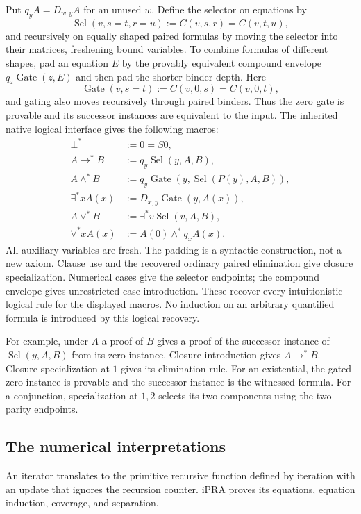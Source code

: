 \documentclass[11pt,letterpaper]{article}
\theoremstyle{definition}
\begin{document}
Put $q_yA=D_{w,y}A$ for an unused $w$.  Define the selector on equations by
\[
 \operatorname{Sel}(v,s=t,r=u)
  := C(v,s,r)=C(v,t,u),
\]
and recursively on equally shaped paired formulas by moving the selector
into their matrices, freshening bound variables.  To combine formulas of
different shapes, pad an equation $E$ by the provably equivalent compound
envelope $q_z\operatorname{Gate}(z,E)$ and then pad the shorter binder
depth.  Here
\[
 \operatorname{Gate}(v,s=t):=C(v,0,s)=C(v,0,t),
\]
and gating also moves recursively through paired binders.  Thus the zero
gate is provable and its successor instances are equivalent to the input.
The inherited native logical interface gives the following macros:
\[
\begin{aligned}
 \bot^* &:=0=S0,\\
 A\to^*B &:=q_y\operatorname{Sel}(y,A,B),\\
 A\wedge^*B &:=q_y\operatorname{Gate}
           (y,\operatorname{Sel}(P(y),A,B)),\\
 \exists^*x A(x)&:=D_{x,y}\operatorname{Gate}(y,A(x)),\\
 A\vee^*B&:=\exists^*v\operatorname{Sel}(v,A,B),\\
 \forall^*x A(x)&:=A(0)\wedge^*q_xA(x).
\end{aligned}
\]
All auxiliary variables are fresh.  The padding is a syntactic
construction, not a new axiom.  Clause use and the recovered ordinary
paired elimination give closure specialization.  Numerical cases give
the selector endpoints; the compound envelope gives unrestricted case
introduction.  These recover every intuitionistic logical rule for the
displayed macros.  No induction on an arbitrary quantified formula is
introduced by this logical recovery.

For example, under $A$ a proof of $B$ gives a proof of the successor
instance of $\operatorname{Sel}(y,A,B)$ from its zero instance.
Closure introduction gives $A\to^*B$.  Closure specialization at $1$
gives its elimination rule.  For an existential, the gated zero instance
is provable and the successor instance is the witnessed formula.
For a conjunction, specialization at $1,2$ selects its two components
using the two parity endpoints.

\subsection{The numerical interpretations}

An iterator translates to the primitive recursive function defined by
iteration with an update that ignores the recursion counter.  iPRA proves
its equations, equation induction, coverage, and separation.
\end{document}
